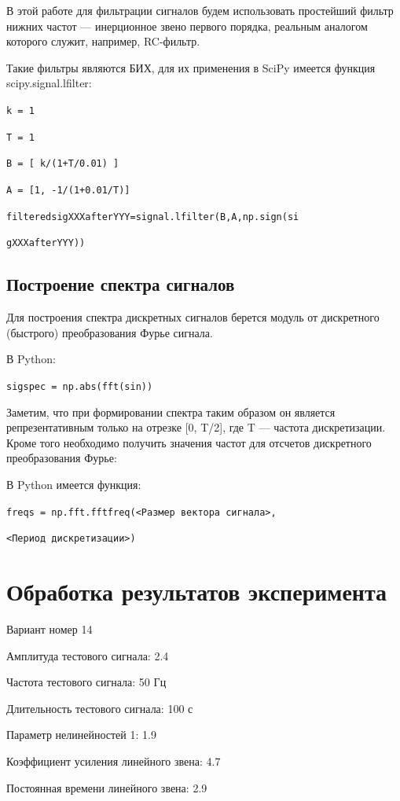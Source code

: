 В этой работе для фильтрации сигналов будем использовать простейший фильтр нижних частот — 
инерционное звено первого порядка, реальным аналогом которого служит, например, RC-фильтр.

Такие фильтры являются БИХ, для их применения в SciPy имеется функция scipy.signal.lfilter:

\texttt{k = 1}

\texttt{T = 1}

\texttt{B = [ k/(1+T/0.01) ]}

\texttt{A = [1, -1/(1+0.01/T)]}

\texttt{filtered\textunderscore sig\textunderscore XXX\textunderscore after\textunderscore YYY=signal.lfilter(B,A,np.sign(si}

\texttt{g\textunderscore XXX\textunderscore after\textunderscore YYY))}
\subsection{Построение спектра сигналов}

Для построения спектра дискретных сигналов берется модуль от дискретного (быстрого) преобразования Фурье сигнала.

В Python:

\texttt{sig\textunderscore spec = np.abs(fft(sin))}

Заметим, что при формировании спектра таким образом он является репрезентативным только на отрезке [0, T/2], 
где T — частота дискретизации. Кроме того необходимо получить значения частот для отсчетов дискретного преобразования Фурье:

В Python имеется функция:

\texttt{freqs = np.fft.fftfreq(<Размер вектора сигнала>, }

\texttt{<Период дискретизации>)}

\section{Обработка результатов эксперимента}

Вариант номер 14

Амплитуда тестового сигнала: 2.4

Частота тестового сигнала: 50 Гц

Длительность тестового сигнала: 100 с

Параметр нелинейностей 1: 1.9

Коэффициент усиления линейного звена: 4.7

Постоянная времени линейного звена: 2.9

